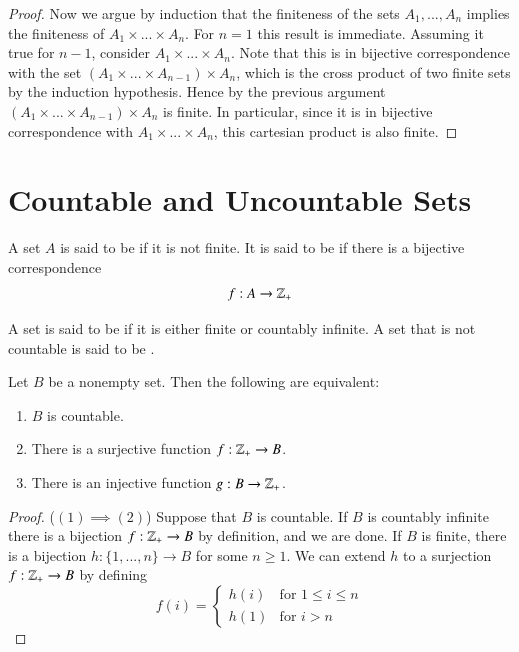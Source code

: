 \documentclass[12pt, a4paper, oneside, openright, titlepage]{book}
\begin{document}
\begin{appendices}
\begin{proof}
        Now we argue by induction that the finiteness of the sets $A_1,...,A_n$ implies the finiteness of $A_1\times ...\times A_n$. For $n = 1$ this result is immediate. Assuming it true for $n-1$, consider $A_1\times ... \times A_n$. Note that this is in bijective correspondence with the set $(A_1\times ... \times A_{n-1})\times A_n$, which is the cross product of two finite sets by the induction hypothesis. Hence by the previous argument $(A_1\times ... \times A_{n-1})\times A_n$ is finite. In particular, since it is in bijective correspondence with $A_1\times ... \times A_n$, this cartesian product is also finite.
    \end{proof}



    \section{Countable and Uncountable Sets}

    
    \begin{defn}
        A set $A$ is said to be  if it is not finite. It is said to be  if there is a bijective correspondence \begin{equation*}
            f:A\rightarrow \mathbb Z_+
        \end{equation*}
    \end{defn}


    \begin{defn}
        A set is said to be  if it is either finite or countably infinite. A set that is not countable is said to be .
    \end{defn}

    \begin{thm}
        Let $B$ be a nonempty set. Then the following are equivalent:\begin{enumerate}
            \item $B$ is countable.
            \item There is a surjective function $f:\mathbb Z_+\rightarrow B$.
            \item There is an injective function $g:B\rightarrow \mathbb Z_+$.
        \end{enumerate}
    \end{thm}
    \begin{proof}
        ($(1)\implies(2)$) Suppose that $B$ is countable. If $B$ is countably infinite there is a bijection $f:\mathbb Z_+\rightarrow B$ by definition, and we are done. If $B$ is finite, there is a bijection $h:\{1,...,n\}\rightarrow B$ for some $n \geq 1$. We can extend $h$ to a surjection $f:\mathbb Z_+\rightarrow B$ by defining \begin{equation*}
            f(i) = \left\{\begin{array}{ll} h(i) & \text{for } 1\leq i \leq n \\
            h(1) & \text{for } i > n \end{array}\right.
        \end{equation*}


\end{proof}
\end{appendices}
\end{document}
